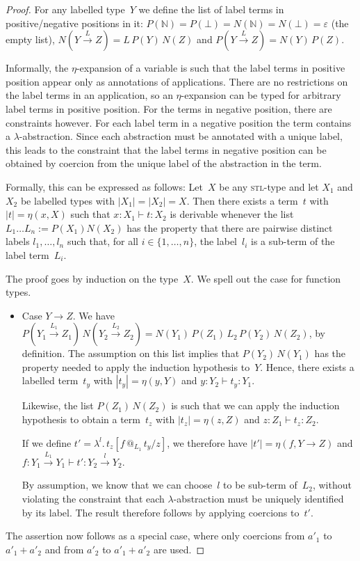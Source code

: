 \documentclass{LMCS}
\makeatletter
\theoremstyle{definition}
\theoremstyle{plain}
\newcommand{\NN}{\mathbb{N}}
\newcommand{\I}[2]{#1 \colon #2}
\newcommand{\SeqTm}[3]{#1 \vdash #2 \colon #3}
\newcommand{\xto}{\xrightarrow}
\newcommand{\tappl}[3]{{#1} {\,@_{#2}\,} {#3}}
\makeatother
\begin{document}
\begin{proof}
  For any labelled type~$Y$ we define the list of label terms in 
  positive/negative positions in it:
  $P(\NN) = P(\bot) = N(\NN) = N(\bot) = \varepsilon$ (the empty list),
  $N(Y\xto L Z) = L\, P(Y)\, N(Z)$ and
  $P(Y\xto L Z) = N(Y)\, P(Z)$.

  Informally, the $\eta$-expansion of a variable is such that the
  label terms in positive position appear only as annotations of 
  applications.  There are no
  restrictions on the label terms in an application, so an 
  $\eta$-expansion can be typed for arbitrary label terms in positive 
  position.  For the terms in negative position, there are
  constraints however.
  For each label term in a negative position the term contains a 
  $\lambda$-abstraction. Since each
  abstraction must be annotated with a unique label, this 
  leads to the constraint that the label terms in negative position
  can be obtained by coercion from the unique label of
  the abstraction in the term.

  Formally, this can be expressed as follows:
  Let~$X$ be any \textsc{stl}-type and let $X_1$ and $X_2$ be 
  labelled types with $|X_1|=|X_2|=X$.
  Then there exists a term~$t$ with $|t|=\eta(x,X)$ 
  such that $\SeqTm{\I x {X_1}}{t}{X_2}$ is derivable
  whenever
  the list $L_1\dots L_n := P(X_1)N(X_2)$ has the property
  that there are pairwise distinct 
  labels $l_1,\dots, l_n$ such that, for all
  $i\in\{1,\dots,n\}$, the label~$l_i$ is a sub-term of the label term~$L_i$.

  The proof goes by induction on the type~$X$. We spell out the
  case for function types.
  \begin{itemize}
    \item Case $Y\to Z$.
      We have 
      $P(Y_1 \xto {L_1} Z_1)\,N(Y_2 \xto {L_2} Z_2) = 
      N(Y_1)\, P(Z_1)\, L_2\, P(Y_2)\, N(Z_2)$,
      by definition.
      The assumption on this list implies that $P(Y_2)\, N(Y_1)$ has the
      property needed to apply the induction hypothesis to~$Y$.
      Hence, there exists a labelled 
      term~$t_y$ with $|t_y|= \eta(y,Y)$ and $\SeqTm{\I y {Y_2}}{t_y}{Y_1}$.

      Likewise, the list $P(Z_1)\, N(Z_2)$ is such that we can apply
      the induction hypothesis to obtain a term~$t_z$ with $|t_z|= \eta(z,Z)$ 
      and $\SeqTm{\I z {Z_1}}{t_z}{Z_2}$.

      If we define $t' = \lambda^l.\, t_z[\tappl f {L_1} {t_y}/z]$, we
      therefore have $|t'|=\eta(f,Y\to Z)$ and
      $\SeqTm{\I f {Y_1\xto{L_1} Y_1}}{t'}{Y_2\xto{l} Y_2}$.

      By assumption, we know that we can choose~$l$ to be sub-term of~$L_2$, 
      without violating the constraint that each $\lambda$-abstraction
      must be uniquely identified by its label.
      The result therefore follows by applying coercions to~$t'$.
  \end{itemize}
  The assertion now follows as a special case, where only  
  coercions from $a'_1$ to $a'_1+a'_2$ and from $a'_2$ to
   $a'_1+a'_2$ are used.
\end{proof}
\end{document}
